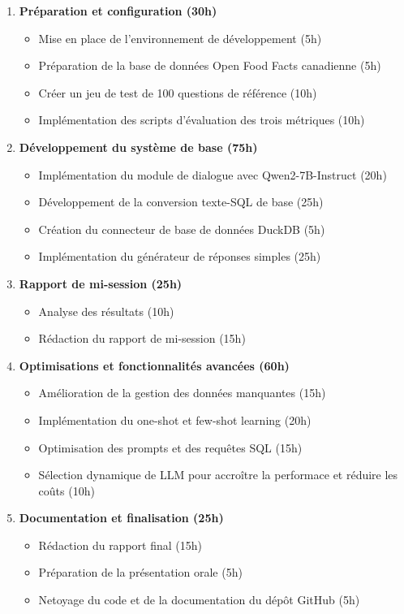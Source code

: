 \documentclass[a4paper,11pt]{article}
\begin{document}
\begin{enumerate}
    \item \textbf{Préparation et configuration (30h)}
    \begin{itemize}
        \item Mise en place de l'environnement de développement (5h)
        \item Préparation de la base de données Open Food Facts canadienne (5h)
        \item Créer un jeu de test de 100 questions de référence (10h)
        \item Implémentation des scripts d'évaluation des trois métriques (10h)
    \end{itemize}

    \item \textbf{Développement du système de base (75h)}
    \begin{itemize}
        \item Implémentation du module de dialogue avec Qwen2-7B-Instruct (20h)
        \item Développement de la conversion texte-SQL de base (25h)
        \item Création du connecteur de base de données DuckDB (5h)
        \item Implémentation du générateur de réponses simples (25h)
    \end{itemize}

    \item \textbf{Rapport de mi-session (25h)}
    \begin{itemize}
        \item Analyse des résultats (10h)
        \item Rédaction du rapport de mi-session (15h)
    \end{itemize}

    \item \textbf{Optimisations et fonctionnalités avancées (60h)}
    \begin{itemize}
        \item Amélioration de la gestion des données manquantes (15h)
        \item Implémentation du one-shot et few-shot learning (20h)
        \item Optimisation des prompts et des requêtes SQL (15h)
        \item Sélection dynamique de LLM pour accroître la performace et réduire les coûts (10h)
    \end{itemize}

    \item \textbf{Documentation et finalisation (25h)}
    \begin{itemize}
        \item Rédaction du rapport final (15h)
        \item Préparation de la présentation orale (5h)
        \item Netoyage du code et de la documentation du dépôt GitHub (5h)
    \end{itemize}
\end{enumerate}
\end{document}
